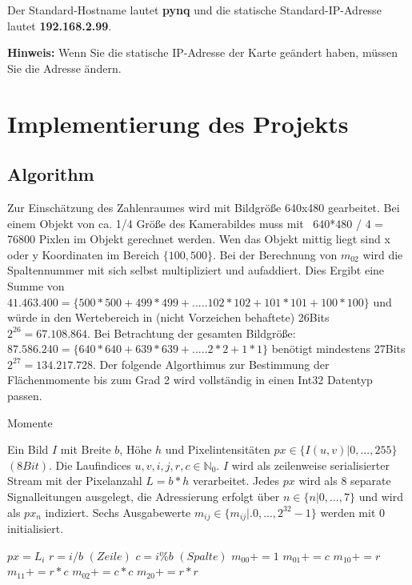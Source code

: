 \documentclass[a4paper]{report}
\begin{document}
Der Standard-Hostname lautet \textbf{pynq} und die statische Standard-IP-Adresse lautet \textbf{192.168.2.99}.

\textbf{Hinweis: } Wenn Sie die statische IP-Adresse der Karte geändert haben, müssen Sie die Adresse ändern. 




\chapter{Implementierung des Projekts}
\label{Implementierung_des_Projekts}

\section{Algorithm}
 
Zur Einschätzung des Zahlenraumes wird mit Bildgröße 640x480 gearbeitet. Bei einem Objekt von ca. 1/4 Größe des Kamerabildes muss mit ~640*480 / 4 = 76800 Pixlen im Objekt gerechnet werden. Wen das Objekt mittig liegt sind x oder y Koordinaten im Bereich $\{100,500\}$. Bei der Berechnung von $m_{02}$ wird die Spaltennummer mit sich selbst multipliziert und aufaddiert. Dies Ergibt eine Summe von $41.463.400=\{500*500+499*499+.....102*102+101*101+100*100\}$ und würde in den Wertebereich in (nicht Vorzeichen behaftete) 26Bits $2^{26}=67.108.864$. Bei  Betrachtung der gesamten Bildgröße: $87.586.240=\{640*640+639*639+.....2*2+1*1\}$ benötigt mindestens 27Bits $2^{27}=134.217.728$.
Der folgende Algorthimus zur Bestimmung der Flächenmomente bis zum Grad 2 wird vollständig in einen Int32 Datentyp passen.

 
\begin{algorithm}
\caption{Momente}
\label{Momente}
\begin{algorithmic}[1]
\Require Ein Bild $I$ mit Breite {$b$}, Höhe {$h$} und Pixelintensitäten $px\in \{I(u,v)|0,...,255\}$ $(8Bit)$. Die Laufindices $u,v,i,j,r,c \in \mathbb{N}_0$. $I$ wird als zeilenweise serialisierter Stream mit der Pixelanzahl {$L=b*h$} verarbeitet. Jedes $px$ wird als 8 separate Signalleitungen ausgelegt, die Adressierung erfolgt über $n\in \{n|0,...,7\}$ und wird als $px_n$ indiziert. Sechs Ausgabewerte {$m_{ij}\in \{m_{ij}|.0,...,2^{32}-1\}$} werden mit 0 initialisiert.

	\State $px = L_i$
    	\State $r=i/b$ $(Zeile)$
    	\State $c=i\%b$  $(Spalte)$
      	\State $m_{00}+=1$    
	    \State $m_{01}+= c$ 
    	\State $m_{10}+= r$
    	\State $m_{11}+= r*c$
    	\State $m_{02}+= c*c$
    	\State $m_{20}+= r*r$
    \EndIf
\EndFor
\end{algorithmic}
\end{algorithm}
\end{document}
